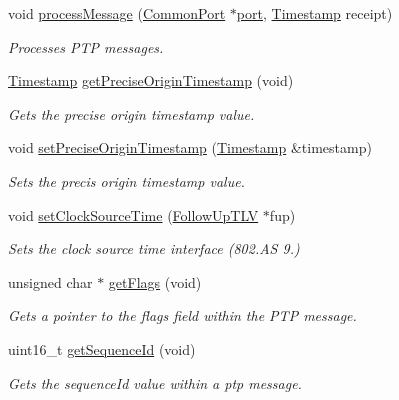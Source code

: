 \begin{DoxyCompactItemize}
void \hyperlink{class_p_t_p_message_follow_up_ad04ed7d4c2722768e8ad00fc86cc4185}{process\+Message} (\hyperlink{class_common_port}{Common\+Port} $\ast$\hyperlink{gst__avb__playbin_8c_a63c89c04d1feae07ca35558055155ffb}{port}, \hyperlink{class_timestamp}{Timestamp} receipt)
\begin{DoxyCompactList}\small\item\em Processes P\+TP messages. \end{DoxyCompactList}\item 
\hyperlink{class_timestamp}{Timestamp} \hyperlink{class_p_t_p_message_follow_up_ae6dd5751546c18bee2c4970544d110f3}{get\+Precise\+Origin\+Timestamp} (void)
\begin{DoxyCompactList}\small\item\em Gets the precise origin timestamp value. \end{DoxyCompactList}\item 
void \hyperlink{class_p_t_p_message_follow_up_a10fa3138535a8aa4dfd3505418fd9708}{set\+Precise\+Origin\+Timestamp} (\hyperlink{class_timestamp}{Timestamp} \&timestamp)
\begin{DoxyCompactList}\small\item\em Sets the precis origin timestamp value. \end{DoxyCompactList}\item 
void \hyperlink{class_p_t_p_message_follow_up_a6626c3e5e12de35f2d146e58b24cd742}{set\+Clock\+Source\+Time} (\hyperlink{class_follow_up_t_l_v}{Follow\+Up\+T\+LV} $\ast$fup)
\begin{DoxyCompactList}\small\item\em Sets the clock source time interface (802.\+AS 9.) \end{DoxyCompactList}\item 
unsigned char $\ast$ \hyperlink{class_p_t_p_message_common_aa75ce7cb63073d090a15ca2c28b6819a}{get\+Flags} (void)
\begin{DoxyCompactList}\small\item\em Gets a pointer to the flags field within the P\+TP message. \end{DoxyCompactList}\item 
uint16\+\_\+t \hyperlink{class_p_t_p_message_common_abd5cac5701120cbbfc56129b31fa801f}{get\+Sequence\+Id} (void)
\begin{DoxyCompactList}\small\item\em Gets the sequence\+Id value within a ptp message. \end{DoxyCompactList}\item 

\end{DoxyCompactItemize}
